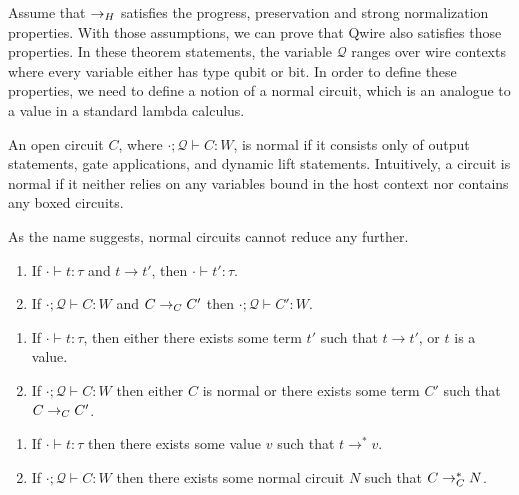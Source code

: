 Assume that $\rightarrow_{H}$ satisfies the progress, preservation and strong normalization properties.
With those assumptions, we can prove that Qwire also satisfies those properties.
In these theorem statements, the variable $\mathscr{Q}$ ranges over wire contexts where every variable either has type qubit or bit.
In order to define these properties, we need to define a notion of a normal circuit, which is an analogue to a value in a standard lambda calculus.
\begin{definition}
An open circuit $C$, where $\cdot;\mathscr{Q}\vdash C : W$, is normal if it consists only of output statements, gate applications, and dynamic lift statements.
Intuitively, a circuit is normal if it neither relies on any variables bound in the host context nor contains any boxed circuits.
\end{definition}
As the name suggests, normal circuits cannot reduce any further.

\begin{theorem}[Preservation]
\thmbegin
\begin{enumerate}
    \item If $\cdot \vdash t : \tau$ and $t \rightarrow t'$, then $\cdot \vdash t' : \tau$.
    \item If $\cdot; \mathscr{Q}\vdash C : W$ and $C \rightarrow_{C} C'$ then $\cdot; \mathscr{Q}\vdash C' : W$.
\end{enumerate}
\end{theorem}

\begin{theorem}[Progress]
\thmbegin
\begin{enumerate}
    \item If $\cdot \vdash t : \tau$, then either there exists some term $t'$ such that $t \rightarrow t'$, or $t$ is a value.
    \item If $\cdot;\mathscr{Q}\vdash C : W$ then either $C$ is normal or there exists some term $C'$ such that $C \rightarrow_{C} C'$.
\end{enumerate}
\end{theorem}

\begin{theorem}
\thmbegin
\begin{enumerate}
    \item If $\cdot \vdash t : \tau$ then there exists some value $v$ such that $t \rightarrow^* v$.
    \item If $\cdot; \mathscr{Q}\vdash C : W$ then there exists some normal circuit $N$ such that $C \rightarrow_{C}^* N$.
\end{enumerate}
\end{theorem}

